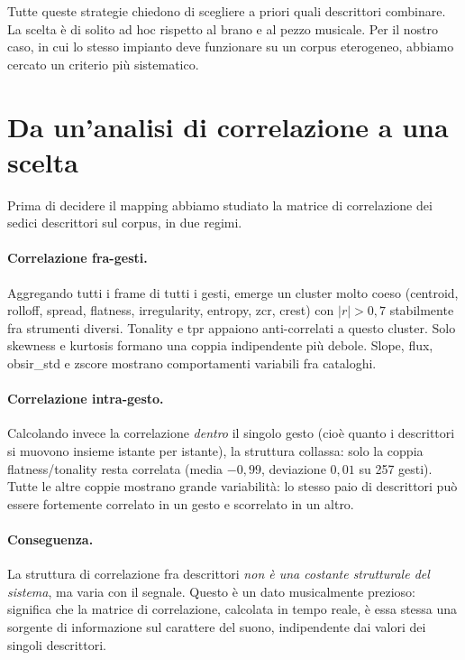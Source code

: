 \documentclass[a4paper,11pt]{article}
\begin{document}
Tutte queste strategie chiedono di scegliere a priori quali descrittori
combinare. La scelta è di solito ad hoc rispetto al brano e al pezzo
musicale. Per il nostro caso, in cui lo stesso impianto deve funzionare
su un corpus eterogeneo, abbiamo cercato un criterio più sistematico.

\section{Da un'analisi di correlazione a una scelta}

Prima di decidere il mapping abbiamo studiato la matrice di correlazione
dei sedici descrittori sul corpus, in due regimi.

\paragraph{Correlazione fra-gesti.}
Aggregando tutti i frame di tutti i gesti, emerge un cluster molto coeso
(centroid, rolloff, spread, flatness, irregularity, entropy, zcr, crest)
con $\lvert r\rvert > 0{,}7$ stabilmente fra strumenti diversi.
Tonality e tpr appaiono anti-correlati a questo cluster. Solo skewness e
kurtosis formano una coppia indipendente più debole. Slope, flux,
obsir\_std e zscore mostrano comportamenti variabili fra cataloghi.

\paragraph{Correlazione intra-gesto.}
Calcolando invece la correlazione \emph{dentro} il singolo gesto
(cioè quanto i descrittori si muovono insieme istante per istante),
la struttura collassa: solo la coppia flatness/tonality resta correlata
(media $-0{,}99$, deviazione $0{,}01$ su 257 gesti). Tutte le altre coppie
mostrano grande variabilità: lo stesso paio di descrittori può essere
fortemente correlato in un gesto e scorrelato in un altro.

\paragraph{Conseguenza.}
La struttura di correlazione fra descrittori \emph{non è una costante
strutturale del sistema}, ma varia con il segnale. Questo è un dato
musicalmente prezioso: significa che la matrice di correlazione, calcolata
in tempo reale, è essa stessa una sorgente di informazione sul carattere
del suono, indipendente dai valori dei singoli descrittori.
\end{document}
